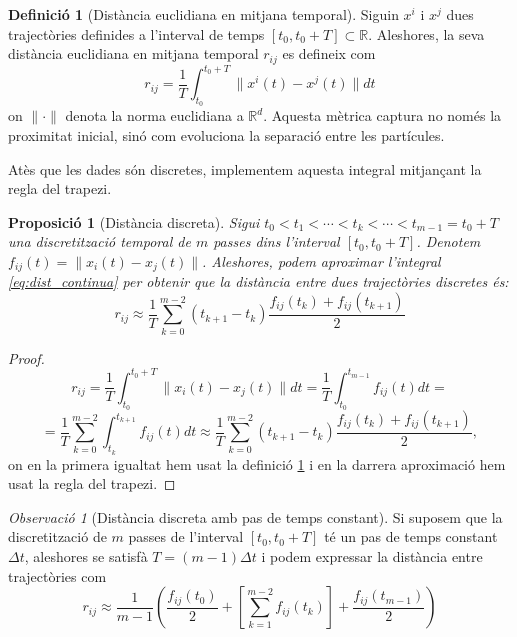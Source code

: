 \documentclass[12,twoside]{TFG-GM}
\newtheorem{proposition}[theorem]{Proposició}
\theoremstyle{definition}
\newtheorem{definition}[theorem]{Definició}
\theoremstyle{remark}
\newtheorem{observation}[theorem]{Observació}
\newcommand{\R}{\mathbb{R}}
\begin{document}
\begin{definition}[Distància euclidiana en mitjana temporal] \label{def:dist_continua}
    Siguin $x^i$ i $x^j$ dues trajectòries definides a l'interval de temps $[t_0, t_0 + T]\subset\R$. Aleshores, la seva distància euclidiana en mitjana temporal $r_{ij}$ es defineix com
    \begin{equation}\label{eq:dist_continua}
    r_{ij} = \frac{1}{T} \int_{t_0}^{t_0+T} \| x^i(t) - x^j(t) \| dt
    \end{equation}
    on $\|\cdot\|$ denota la norma euclidiana a $\R^d$. Aquesta mètrica captura no només la proximitat inicial, sinó com evoluciona la separació entre les partícules.
\end{definition}

Atès que les dades són discretes, implementem aquesta integral mitjançant la regla del trapezi. 

\begin{proposition}[Distància discreta] \label{prop:dist_discreta_general}
    Sigui $t_0 < t_1 < \cdots < t_{k} < \cdots < t_{m-1} = t_0 + T$ una discretització temporal de $m$ passes dins l'interval $[t_0, t_0 + T]$.
    Denotem $f_{ij}(t) = \| x_i(t) - x_j(t) \|$. Aleshores, podem aproximar l'integral \eqref{eq:dist_continua} per obtenir que la distància entre dues trajectòries discretes és:
    \begin{equation}\label{eq:dist_discreta_general}
    r_{ij} \approx \frac{1}{T} \sum_{k=0}^{m-2} (t_{k+1} - t_{k}) \frac{f_{ij}(t_k) + f_{ij}(t_{k+1})}{2}
    \end{equation}
\end{proposition}

\begin{proof}
    $$r_{ij} = \frac{1}{T} \int_{t_0}^{t_0+T} \|x_i(t)-x_j(t)\| dt = \frac{1}{T}\int_{t_0}^{t_{m-1}}f_{ij}(t)dt=$$
    $$= \frac{1}{T} \sum_{k=0}^{m-2} \int_{t_k}^{t_{k+1}} f_{ij}(t) dt
    \approx \frac{1}{T} \sum_{k=0}^{m-2} (t_{k+1} - t_{k}) \frac{f_{ij}(t_k) + f_{ij}(t_{k+1})}{2},$$
    on en la primera igualtat hem usat la definició \ref{def:dist_continua} i en la darrera aproximació hem usat la regla del trapezi.
\end{proof}

\begin{observation}[Distància discreta amb pas de temps constant]
    Si suposem que la discretització de $m$ passes de l'interval $[t_0, t_0 + T]$ té un pas de temps constant $\Delta t$, aleshores se satisfà $T=(m-1)\Delta t$ i podem expressar la distància entre trajectòries com
    \begin{equation}
        r_{ij} \approx \frac{1}{m-1} \left( \frac{f_{ij}(t_0)}{2} + \left[ \sum_{k=1}^{m-2} f_{ij}(t_k) \right] + \frac{f_{ij}(t_{m-1})}{2}\right)
    \end{equation}
\end{observation}
\end{document}
